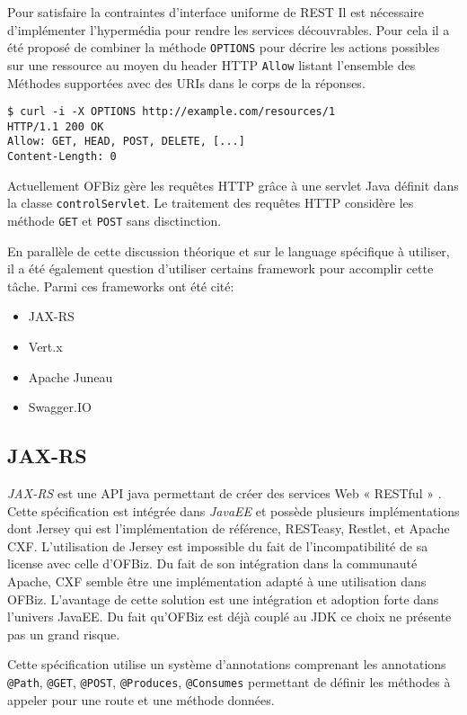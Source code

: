 \documentclass[a4paper, 11pt]{report}
\begin{document}
Pour satisfaire la contraintes d'interface uniforme de REST Il est
nécessaire d'implémenter l'hypermédia pour rendre les services
découvrables. Pour cela il a été proposé de combiner la méthode
\verb=OPTIONS= pour décrire les actions possibles sur une ressource au
moyen du header HTTP \verb=Allow= listant l'ensemble des Méthodes
supportées avec des URIs dans le corps de la réponses.

\begin{verbatim}
$ curl -i -X OPTIONS http://example.com/resources/1
HTTP/1.1 200 OK
Allow: GET, HEAD, POST, DELETE, [...]
Content-Length: 0
\end{verbatim}

Actuellement OFBiz gère les requêtes HTTP grâce à une servlet Java
\Cite{Chan2017servlet} définit dans la classe \verb=controlServlet=.
Le traitement des requêtes HTTP considère les méthode \verb=GET= et
\verb=POST= sans disctinction.

En parallèle de cette discussion théorique et sur le language
spécifique à utiliser, il a été également question d'utiliser certains
framework pour accomplir cette tâche. Parmi ces frameworks ont été
cité:

\begin{itemize}
\item JAX-RS
\item Vert.x
\item Apache Juneau
\item Swagger.IO
\end{itemize}

\subsection{JAX-RS}

\emph{JAX-RS} est une API java permettant de créer des services Web «
RESTful » \cite{pericas2013jax}. Cette spécification est intégrée dans
\emph{JavaEE} et possède plusieurs implémentations dont Jersey qui est
l'implémentation de référence, RESTeasy, Restlet, et Apache CXF.
L'utilisation de Jersey est impossible du fait de l'incompatibilité de
sa license avec celle d'OFBiz.  Du fait de son intégration dans la
communauté Apache, CXF semble être une implémentation adapté à une
utilisation dans OFBiz.  L'avantage de cette solution est une
intégration et adoption forte dans l'univers JavaEE.  Du fait qu'OFBiz
est déjà couplé au JDK ce choix ne présente pas un grand risque.

Cette spécification utilise un système d'annotations comprenant les
annotations \verb=@Path=, \verb=@GET=, \verb=@POST=, \verb=@Produces=,
\verb=@Consumes= permettant de définir les méthodes à appeler pour une
route et une méthode données.
\end{document}

